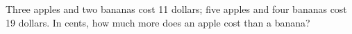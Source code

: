 Three apples and two bananas cost 11 dollars; five apples and four bananas cost 19 dollars. In cents, how much more does an apple cost than a banana?
